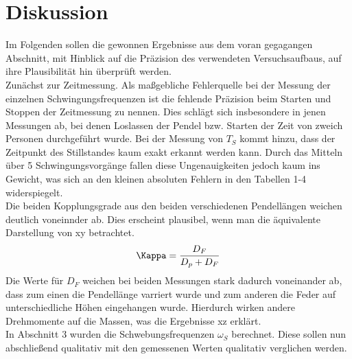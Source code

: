 \section{Diskussion}
Im Folgenden sollen die gewonnen Ergebnisse aus dem voran gegagangen Abschnitt, mit Hinblick auf die Präzision
des verwendeten Versuchsaufbaus, auf ihre Plausibilität hin überprüft werden.\\
Zunächst zur Zeitmessung. Als maßgebliche Fehlerquelle bei der Messung der einzelnen Schwingungsfrequenzen ist die
fehlende Präzision beim Starten und Stoppen der Zeitmessung zu nennen. Dies schlägt sich
insbesondere in jenen Messungen ab, bei denen Loslassen der Pendel bzw. Starten der Zeit
von zweich Personen durchgeführt wurde. Bei der Messung von $T_{S}$ kommt hinzu, dass
der Zeitpunkt des Stillstandes kaum exakt erkannt werden kann. Durch das Mitteln über
5 Schwingungsvorgänge fallen diese Ungenauigkeiten jedoch kaum ins Gewicht, was sich an
den kleinen absoluten Fehlern in den Tabellen 1-4 widerspiegelt. \\
Die beiden Kopplungsgrade aus den beiden verschiedenen Pendellängen weichen deutlich
voneinnder ab. Dies erscheint plausibel, wenn man die äquivalente Darstellung von xy
betrachtet.
\begin{equation*}
  \Kappa = \frac{D_F}{D_p + D_F}
\end{equation*}
Die Werte für $D_F$ weichen bei beiden Messungen stark dadurch voneinander ab, dass
zum einen die Pendellänge varriert wurde und zum anderen die Feder auf unterschiedliche
Höhen eingehangen wurde. Hierdurch wirken andere Drehmomente auf die Massen, was die
Ergebnisse xz erklärt. \\
In Abschnitt 3 wurden die Schwebungsfrequenzen $\omega_{S}$ berechnet. Diese sollen nun
abschließend qualitativ mit den gemessenen Werten qualitativ verglichen werden.   
